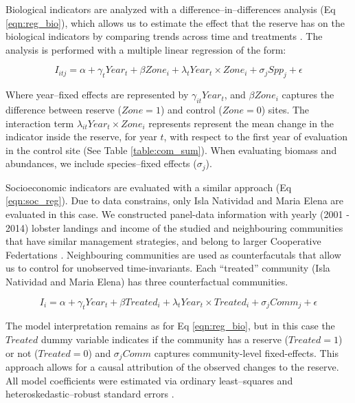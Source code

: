 \documentclass{frontiersSCNS}
\theoremstyle{definition}
\theoremstyle{definition}
\theoremstyle{definition}
\theoremstyle{remark}
\begin{document}
Biological indicators are analyzed with a difference--in--differences
analysis (Eq \ref{eqn:reg_bio}), which allows us to estimate the effect
that the reserve has on the biological indicators by comparing trends
across time and treatments
\citep{moland_2013-VP,Villasenor-Derbez_2018}. The analysis is performed
with a multiple linear regression of the form:

\begin{equation}
I_{itj} = \alpha + \gamma_{t} Year_t + \beta Zone_i + \lambda_{t} Year_t\times Zone_i + \sigma_jSpp_j + \epsilon
\label{eqn:reg_bio}
\end{equation}

Where year--fixed effects are represented by \(\gamma_{it} Year_t\), and
\(\beta Zone_i\) captures the difference between reserve (\(Zone = 1\))
and control (\(Zone = 0\)) sites. The interaction term
\(\lambda_{it} Year_t\times Zone_i\) represents represent the mean
change in the indicator inside the reserve, for year \(t\), with respect
to the first year of evaluation in the control site (See Table
\ref{table:com_sum}). When evaluating biomass and abundances, we include
species--fixed effects (\(\sigma_j\)).

Socioeconomic indicators are evaluated with a similar approach (Eq
\ref{eqn:soc_reg}). Due to data constrains, only Isla Natividad and
Maria Elena are evaluated in this case. We constructed panel-data
information with yearly (2001 - 2014) lobster landings and income of the
studied and neighbouring communities that have similar management
strategies, and belong to larger Cooperative Federtations
\citep{mccay_2017-1m,ayer_2018}. Neighbouring communities are used as
counterfacutals that allow us to control for unobserved time-invariants.
Each ``treated'' community (Isla Natividad and Maria Elena) has three
counterfactual communities.

\begin{equation}
I_i = \alpha + \gamma_{t} Year_t + \beta Treated_i + \lambda_{t} Year_t\times Treated_i + \sigma_jComm_j +\epsilon
\label{eqn:soc_reg}
\end{equation}

The model interpretation remains as for Eq \ref{eqn:reg_bio}, but in
this case the \(Treated\) dummy variable indicates if the community has
a reserve (\(Treated = 1\)) or not (\(Treated = 0\)) and
\(\sigma_jComm\) captures community-level fixed-effects. This approach
allows for a causal attribution of the observed changes to the reserve.
All model coefficients were estimated via ordinary least--squares and
heteroskedastic--robust standard errors \citep{zeileis_2004-7n}.
\end{document}
